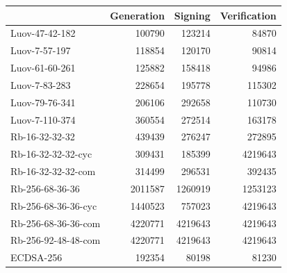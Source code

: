 \documentclass[thesis=M,english]{FITthesis}[2019/12/23]
\begin{document}
\begin{table}[]
\centering
\begin{tabular}{|l|r|r|r|}
\hline
                    & \multicolumn{1}{l|}{Generation} & \multicolumn{1}{l|}{Signing} & \multicolumn{1}{l|}{Verification} \\ \hline
Luov-47-42-182      & 100790                          & 123214                       & 84870                             \\ \hline
Luov-7-57-197       & 118854                          & 120170                       & 90814                             \\ \hline
Luov-61-60-261      & 125882                          & 158418                       & 94986                             \\ \hline
Luov-7-83-283       & 228654                          & 195778                       & 115302                            \\ \hline
Luov-79-76-341      & 206106                          & 292658                       & 110730                            \\ \hline
Luov-7-110-374      & 360554                          & 272514                       & 163178                            \\ \hline
Rb-16-32-32-32      & 439439                          & 276247                       & 272895                            \\ \hline
Rb-16-32-32-32-cyc  & 309431                          & 185399                       & 4219643                           \\ \hline
Rb-16-32-32-32-com  & 314499                          & 296531                       & 392435                            \\ \hline
Rb-256-68-36-36     & 2011587                         & 1260919                      & 1253123                           \\ \hline
Rb-256-68-36-36-cyc & 1440523                         & 757023                       & 4219643                           \\ \hline
Rb-256-68-36-36-com & 4220771                         & 4219643                      & 4219643                           \\ \hline
Rb-256-92-48-48-com & 4220771                         & 4219643                      & 4219643                           \\ \hline
 ECDSA-256 &  192354   &  80198 &  81230      \\ \hline

\end{tabular}
\end{table}
\end{document}
